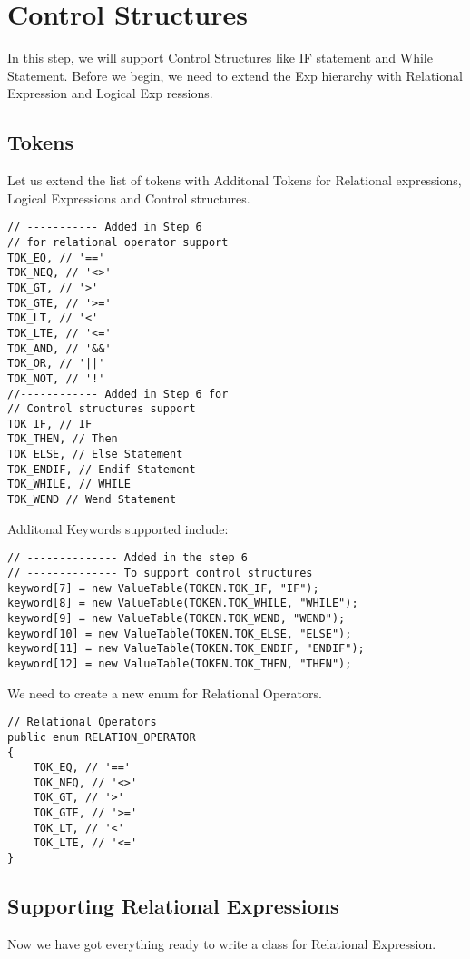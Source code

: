 \chapter{Control Structures}
In this step, we will support Control Structures like IF statement and While Statement. Before we begin, we need to extend the Exp hierarchy with Relational Expression and Logical Exp	ressions. 

\section{Tokens}
Let us extend the list of tokens with Additonal Tokens for Relational expressions, Logical Expressions and Control structures.
\lstset{style=csharp}
\begin{lstlisting}
// ----------- Added in Step 6
// for relational operator support
TOK_EQ, // '=='
TOK_NEQ, // '<>'
TOK_GT, // '>'
TOK_GTE, // '>='
TOK_LT, // '<'
TOK_LTE, // '<='
TOK_AND, // '&&'
TOK_OR, // '||'
TOK_NOT, // '!'
//------------ Added in Step 6 for
// Control structures support
TOK_IF, // IF
TOK_THEN, // Then
TOK_ELSE, // Else Statement
TOK_ENDIF, // Endif Statement
TOK_WHILE, // WHILE
TOK_WEND // Wend Statement
\end{lstlisting}

Additonal Keywords supported include:
\lstset{style=csharp}
\begin{lstlisting}
// -------------- Added in the step 6
// -------------- To support control structures
keyword[7] = new ValueTable(TOKEN.TOK_IF, "IF");
keyword[8] = new ValueTable(TOKEN.TOK_WHILE, "WHILE");
keyword[9] = new ValueTable(TOKEN.TOK_WEND, "WEND");
keyword[10] = new ValueTable(TOKEN.TOK_ELSE, "ELSE");
keyword[11] = new ValueTable(TOKEN.TOK_ENDIF, "ENDIF");
keyword[12] = new ValueTable(TOKEN.TOK_THEN, "THEN");
\end{lstlisting}

We need to create a new enum for Relational Operators.

\lstset{style=csharp}
\begin{lstlisting}
// Relational Operators
public enum RELATION_OPERATOR
{
	TOK_EQ, // '=='
	TOK_NEQ, // '<>'
	TOK_GT, // '>'
	TOK_GTE, // '>='
	TOK_LT, // '<'
	TOK_LTE, // '<='
}
\end{lstlisting}
\section{Supporting Relational Expressions}
Now we have got everything ready to write a class for Relational Expression.
